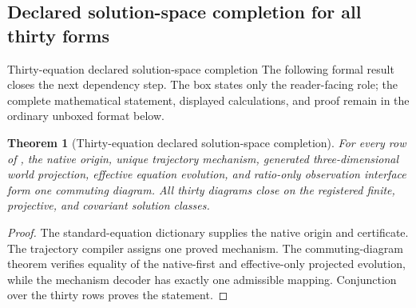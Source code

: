 \documentclass[11pt]{article}
\numberwithin{equation}{section}
\newtheorem{theorem}[definition]{Theorem}
\theoremstyle{remark}
\begin{document}
\subsection{Declared solution-space completion for all thirty forms}
\begin{proofguide}{Thirty-equation declared solution-space completion}
The following formal result closes the next dependency step. The box states only the reader-facing role; the complete mathematical statement, displayed calculations, and proof remain in the ordinary unboxed format below.
\end{proofguide}
\begin{theorem}[Thirty-equation declared solution-space completion]
For every row of , the native origin, unique trajectory mechanism, generated three-dimensional world projection, effective equation evolution, and ratio-only observation interface form one commuting diagram. All thirty diagrams close on the registered finite, projective, and covariant solution classes.
\end{theorem}
\begin{proof}
The standard-equation dictionary supplies the native origin and certificate. The trajectory compiler assigns one proved mechanism. The commuting-diagram theorem verifies equality of the native-first and effective-only projected evolution, while the mechanism decoder has exactly one admissible mapping. Conjunction over the thirty rows proves the statement.
\end{proof}
\end{document}

